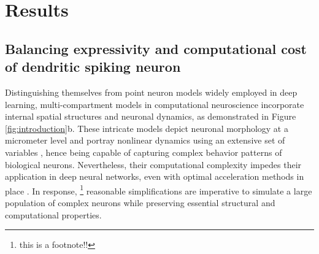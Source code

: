 \section*{Results}
\label{sec:results}

\subsection*{Balancing expressivity and computational cost of dendritic spiking neuron}
\label{subsec:results-dendsn}

Distinguishing themselves from point neuron models widely employed in deep learning, multi-compartment models in computational neuroscience incorporate internal spatial structures and neuronal dynamics, as demonstrated in Figure \ref{fig:introduction}b. These intricate models depict neuronal morphology at a micrometer level and portray nonlinear dynamics using an extensive set of variables  \cite{schutter1994purkinje,poirazi2003arithmetic,hay2011pyramidal}, hence being capable of capturing complex behavior patterns of biological neurons. Nevertheless, their computational complexity impedes their application in deep neural networks, even with optimal acceleration methods in place \cite{zhang2023gpubased}. In response, \footnote{this is a footnote!!} reasonable simplifications are imperative to simulate a large population of complex neurons while preserving essential structural and computational properties.

